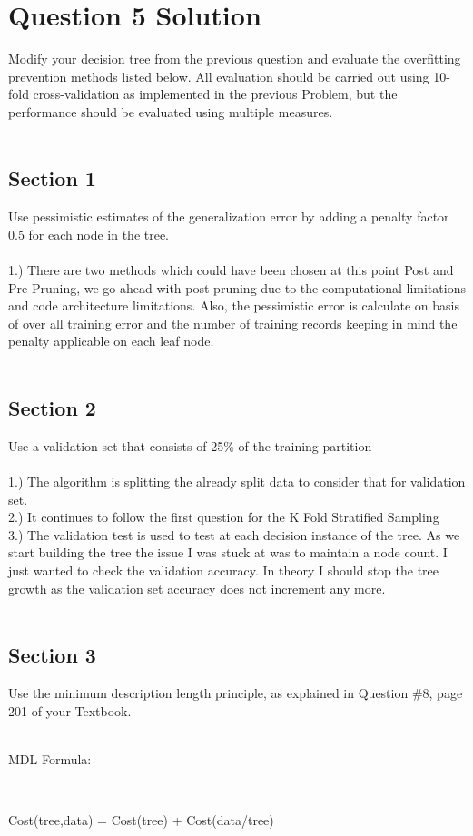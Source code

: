 \documentclass[12pt,a4paper,titlepage]{article}
\begin{document}
{{{}
\section{Question 5 Solution}{
Modify your decision tree from the previous question and evaluate the overfitting prevention methods listed below. All evaluation should be carried out using 10-fold cross-validation as implemented in the previous Problem, but the performance should be evaluated using multiple measures.\\~\\
\subsection{Section 1}{
Use pessimistic estimates of the generalization error by adding a penalty factor 0.5 for each node in the tree.\\~\\
1.) There are two methods which could have been chosen at this point Post and Pre Pruning, we go ahead with post pruning due to the computational limitations and code architecture limitations. Also, the pessimistic error is calculate on basis of over all training error and the number of training records keeping in mind the penalty applicable on each leaf node.\\~\\
}
\subsection{Section 2}{
Use a validation set that consists of 25\% of the training partition\\~\\
1.) The algorithm is splitting the already split data to consider that for validation set.\\
2.) It continues to follow the first question for the K Fold Stratified Sampling\\
3.) The validation test is used to test at each decision instance of the tree. As we start building the tree the issue I was stuck at was to maintain a node count. I just wanted to check the validation accuracy. In theory I should stop the tree growth as the validation set accuracy does not increment any more.\\~\\
}
\subsection{Section 3}{
Use the minimum description length principle, as explained in Question \#8, page 201 of
your Textbook.\\~\\
\centerline{MDL Formula:}~\\
\centerline{Cost(tree,data) = Cost(tree) + Cost(data/tree)}~\\

}}}}
\end{document}
